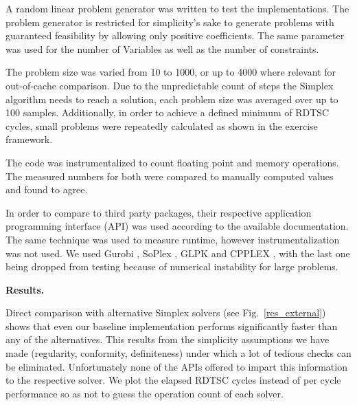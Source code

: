 \documentclass[letterpaper]{article}
\newcommand{\mypar}[1]{{\bf #1.}}
\begin{document}
A random linear problem generator was written to test the implementations. 
The problem generator is restricted for simplicity's sake to generate problems with guaranteed feasibility by allowing only positive coefficients. 
The same parameter was used for the number of Variables as well as the number of constraints.

The problem size was varied from 10 to 1000, or up to 4000 where relevant for out-of-cache comparison.
Due to the unpredictable count of steps the Simplex algorithm needs to reach a solution, each problem size was averaged over up to 100 samples.
Additionally, in order to achieve a defined minimum of RDTSC cycles, small problems were repeatedly calculated as shown in the exercise framework.

The code was instrumentalized to count floating point and memory operations. The measured numbers for both were compared to manually computed values and found to agree.

In order to compare to third party packages, their respective application programming interface (API) was used according to the available documentation. 
The same technique was used to measure runtime, however instrumentalization was not used.
We used Gurobi \cite{gurobi}, SoPlex \cite{soplex}, GLPK \cite{glpk} and CPPLEX \cite{cpplex}, with the last one being dropped from testing because of numerical instability for large problems.


\mypar{Results}

Direct comparison with alternative Simplex solvers (see Fig.~\ref{res_external}) shows that even our baseline implementation performs significantly faster than any of the alternatives.
This results from the simplicity assumptions we have made (regularity, conformity, definiteness) under which a lot of tedious checks can be eliminated.
Unfortunately none of the APIs offered to impart this information to the respective solver.
We plot the elapsed RDTSC cycles instead of per cycle performance so as not to guess the operation count of each solver.
\end{document}
